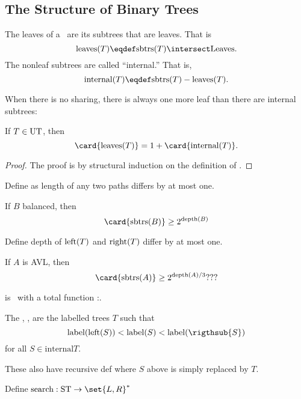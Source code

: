 \iffalse
Now we can replace the `$\leq$'' in the proof of
Lemma~\ref{lem:finsubtrees}, namely,
\[
\card{\subtrees{T}} = 1 + \card{\subtrees{leftsub{T}}} + \card{\subtrees{leftsub{T}}}.
\]
for all $T \in \ubt$.
\fi

\subsection{The Structure of Binary Trees}

The leaves of a \rectree\ are its subtrees that are leaves.  That is
\[
\text{leaves}(T) \eqdef \subtrees{T} \intersect \leafset.
\]
The nonleaf subtrees are called ``internal.''  That is,
\[
\text{internal}(T) \eqdef \subtrees{T} - \text{leaves}(T).
\]

When there is no sharing, there is always one more leaf than there are
internal subtrees:

\begin{lemma}\label{}
If $T \in \ubt$, then
\[
\card{\text{leaves}(T)} = 1 + \card{\text{internal}(T)}.
\]
\end{lemma}
\begin{proof}
The proof is by structural induction on the definition of \ubt.

\end{proof} 

Define  as length of any two paths differs by at
most one.

\begin{lemma}\label{}
If $B$ balanced, then
\[
\card{\subtrees{B}} \geq 2^{\text{depth}(B)}
\]
\end{lemma}

Define  depth of $\text{left}(T)$ and $\text{right}(T)$
differ by at most one.

\begin{lemma}\label{}
If $A$ is AVL, then
\[
\card{\subtrees{A}} \geq 2^{\text{depth}(A)/3}???
\]
\end{lemma}

\begin{definition}
 is \bintree\ with a total function
:\bintree \to {}.

The , \Searcht, are the labelled trees $T$ such that
\[
\text{label}(\leftsub{S}) < \text{label}(S) < \text{label}(\rigthsub{S})
\]
for all $S \in \text{internal}{T}$.
\end{definition}

These also have recursive def where $S$ above is simply replaced by
$T$.

Define $\text{search}: \Searcht \to \set{L,R}^*$


  \endinput
